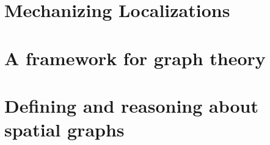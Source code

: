 \documentclass[preprint,10pt, numbers]{sigplanconf}
\begin{document}


\section{Mechanizing Localizations}
\label{sec:localizations}


\section{A framework for graph theory}
\label{sec:mathgraph}



\section{Defining and reasoning about spatial graphs}
\label{sec:spacegraph}





%


%

%
\end{document}
